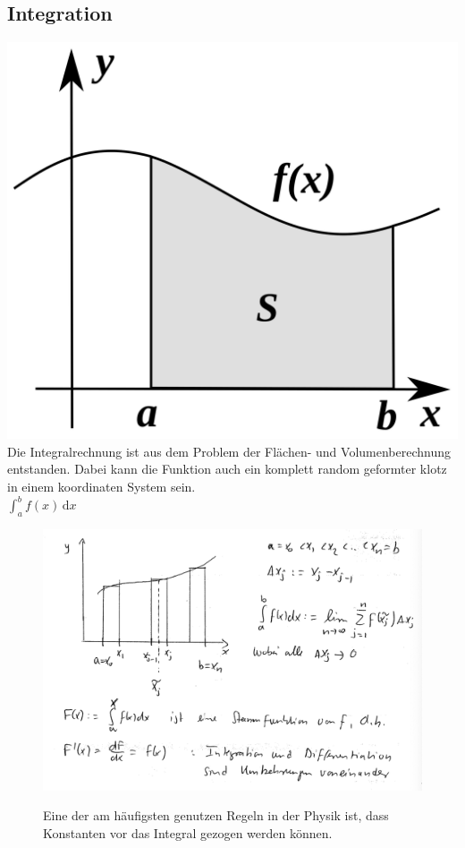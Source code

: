 \documentclass[11pt]{article}
\begin{document}
	\subsection{Integration}
	\includegraphics[scale=0.05]{integral.png}
	Die Integralrechnung ist aus dem Problem der Flächen- und Volumenberechnung entstanden.
	Dabei kann die Funktion auch ein komplett random geformter klotz in einem koordinaten System sein.\\
	$\int_a^b f(x)\,\mathrm dx$\\
	\begin{figure}[htbp]
		\begin{minipage}[t]{6cm}
			\vspace{0pt}
			\centering
			\includegraphics[scale=0.45]{Integrationbeispiel.png}
		\end{minipage}
		\hfill
		\begin{minipage}[t]{6cm}
			\vspace{0pt}
			Eine der am  häufigsten genutzen Regeln in der Physik ist, dass Konstanten vor das Integral gezogen werden können.
		\end{minipage}
	\end{figure}
\end{document}
